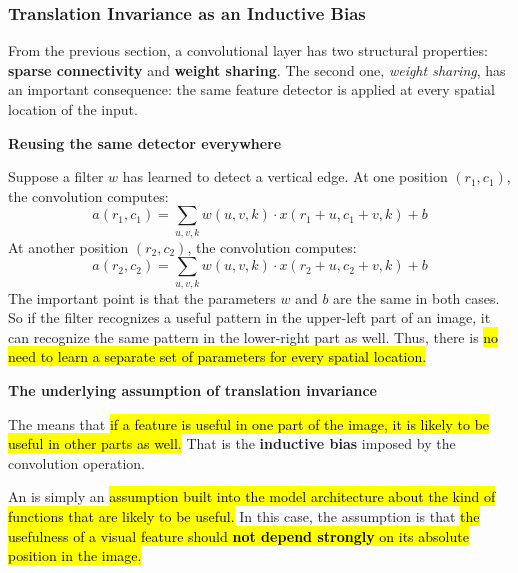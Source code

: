 \subsubsection{Translation Invariance as an Inductive Bias}\label{sec:translation-invariance-as-an-inductive-bias}

From the previous section, a convolutional layer has two structural properties: \textbf{sparse connectivity} and \textbf{weight sharing}. The second one, \emph{weight sharing}, has an important consequence: the same feature detector is applied at every spatial location of the input.

\highspace
\begin{flushleft}
    \textcolor{Green3}{ \textbf{Reusing the same detector everywhere}}
\end{flushleft}
Suppose a filter $w$ has learned to detect a vertical edge. At one position $(r_1, c_1)$, the convolution computes:
\begin{equation*}
    a(r_1, c_1) = \sum_{u,v,k} w\left(u,v,k\right) \cdot x\left(r_1 + u, c_1 + v, k\right) + b
\end{equation*}
At another position $(r_2, c_2)$, the convolution computes:
\begin{equation*}
    a(r_2, c_2) = \sum_{u,v,k} w\left(u,v,k\right) \cdot x\left(r_2 + u, c_2 + v, k\right) + b
\end{equation*}
The important point is that the parameters $w$ and $b$ are the same in both cases. So if the filter recognizes a useful pattern in the upper-left part of an image, it can recognize the same pattern in the lower-right part as well. Thus, there is \hl{no need to learn a separate set of parameters for every spatial location.}

\highspace
\begin{flushleft}
    \textcolor{Green3}{ \textbf{The underlying assumption of translation invariance}}
\end{flushleft}
The  means that \hl{if a feature is useful in one part of the image, it is likely to be useful in other parts as well.} That is the \textbf{inductive bias} imposed by the convolution operation.

\highspace
An  is simply an \hl{assumption built into the model architecture about the kind of functions that are likely to be useful.} In this case, the assumption is that \hl{the usefulness of a visual feature should \textbf{not depend strongly} on its absolute position in the image.}

